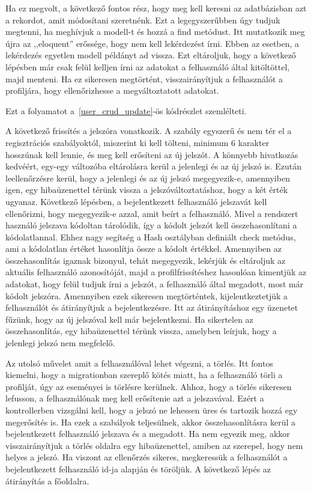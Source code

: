 \documentclass[
]{thesis-ekf}
\theoremstyle{definition}
\theoremstyle{remark}
\begin{document}
	Ha ez megvolt, a következő fontos rész, hogy meg kell keresni az adatbázisban azt a rekordot, amit módosítani szeretnénk. Ezt a legegyszerűbben úgy tudjuk megtenni, ha meghívjuk a modell-t és hozzá a find metódust. Itt mutatkozik meg újra az ,,eloquent'' erőssége, hogy nem kell lekérdezést írni. Ebben az esetben, a lekérdezés egyetlen modell példányt ad vissza. Ezt eltároljuk, hogy a következő lépésben már csak felül kelljen írni az adatokat a felhasználó által kitöltöttel, majd menteni. Ha ez sikeresen megtörtént, visszairányítjuk a felhasználót a profiljára, hogy ellenőrizhesse a megváltoztatott adatokat. 
	
	Ezt a folyamatot a~\ref{user_crud_update}-ös kódrészlet szemlélteti.
	
	
	
	A következő frissítés a jelszóra vonatkozik. A szabály egyszerű és nem tér el a regisztrációs szabályoktól, miszerint ki kell tölteni, minimum 6 karakter hosszúnak kell lennie, és meg kell erősíteni az új jelszót. A könnyebb hivatkozás kedvéért, egy-egy változóba eltárolásra kerül a jelenlegi és az új jelszó is. Ezután leellenőrzésre kerül, hogy a jelenlegi és az új jelszó megegyezik-e, amennyiben igen, egy hibaüzenettel térünk vissza a jelszóváltoztatáshoz, hogy a két érték ugyanaz. Következő lépésben, a bejelentkezett felhasználó jelszavát kell ellenőrizni, hogy megegyezik-e azzal, amit beírt a felhasználó. Mivel a rendszert használó jelszava kódoltan tárolódik, így a kódolt jelszót kell összehasonlítani a kódolatlannal. Ehhez nagy segítség a Hash osztályban definiált check metódus, ami a kódolatlan értéket hasonlítja össze a kódolt értékkel. Amennyiben az összehasonlítás igaznak bizonyul, tehát megegyezik, lekérjük és eltároljuk az aktuális felhasználó azonosítóját, majd a profilfrissítéshez hasonlóan kimentjük az adatokat, hogy felül tudjuk írni a jelszót, a felhasználó által megadott, most már kódolt jelszóra. Amennyiben ezek sikeresen megtörténtek, kijelentkeztetjük a felhasználót és átirányítjuk a bejelentkezésre. Itt az átirányításhoz egy üzenetet fűzünk, hogy az új jelszóval kell már bejelentkezni. Ha sikertelen az összehasonlítás, egy hibaüzenettel térünk vissza, amelyben leírjuk, hogy a jelenlegi jelszó nem megfelelő. 
	
	Az utolsó művelet amit a felhasználóval lehet végezni, a törlés. Itt fontos kiemelni, hogy a migrationban szereplő kötés miatt, ha a felhasználó törli a profilját, úgy az eseményei is törlésre kerülnek. Ahhoz, hogy a törlés sikeresen lefusson, a felhasználónak meg kell erősítenie azt a jelszavával. Ezért a kontrollerben vizsgálni kell, hogy a jelszó ne lehessen üres és tartozik hozzá egy megerősítés is. Ha ezek a szabályok teljesülnek, akkor összehasonlításra kerül a bejelentkezett felhasználó jelszava és a megadott. Ha nem egyezik meg, akkor visszairányítjuk a törlés oldalra egy hibaüzenettel, amiben az szerepel, hogy nem helyes a jelszó. Ha viszont az ellenőrzés sikeres, megkeressük a felhasználót a bejelentkezett felhasználó id-ja alapján és töröljük. A következő lépés az átirányítás a főoldalra.
	
\end{document}
